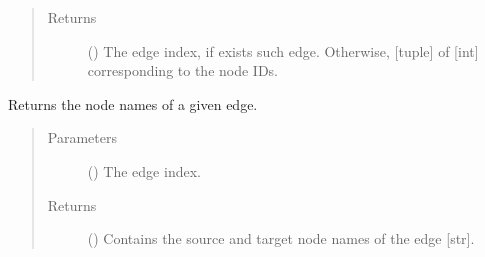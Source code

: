 \documentclass[letterpaper,10pt,english]{sphinxmanual}
\begin{document}
\begin{fulllineitems}
\begin{fulllineitems}
\begin{quote}
\begin{description}
\begin{itemize}
\end{itemize}

\item[{Returns}] \leavevmode
() \textendash{} The edge index, if exists such edge. Otherwise,
{[}tuple{]} of {[}int{]} corresponding to the node IDs.

\end{description}\end{quote}

\end{fulllineitems}


\begin{fulllineitems}
\label{\detokenize{reference:pypath.main.PyPath.edge_loc}}
\end{fulllineitems}


\begin{fulllineitems}
\label{\detokenize{reference:pypath.main.PyPath.edge_names}}
Returns the node names of a given edge.
\begin{quote}\begin{description}
\item[{Parameters}] \leavevmode
{} () \textendash{} The edge index.

\item[{Returns}] \leavevmode
() \textendash{} Contains the source and target node names of
the edge {[}str{]}.

\end{description}\end{quote}

\end{fulllineitems}


\begin{fulllineitems}
\label{\detokenize{reference:pypath.main.PyPath.edges_3d}}
\end{fulllineitems}


\end{fulllineitems}
\end{document}

